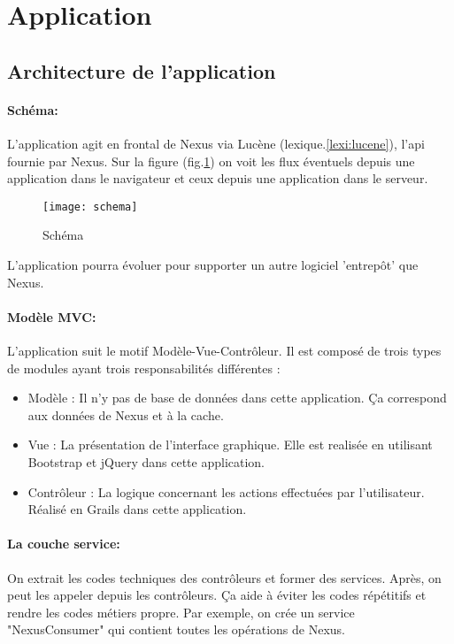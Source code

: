 \section{Application}

\subsection{Architecture de l'application}

\paragraph{Schéma:}
L'application agit en frontal de Nexus via Lucène (lexique.\ref{lexi:lucene}), l'api fournie par Nexus.
Sur la figure (fig.\ref{fig:schema}) on voit les flux éventuels depuis une application dans le navigateur et ceux depuis une application dans le serveur.

\begin{figure}[ht]
 \centering
 \texttt{[image: schema]}
 \caption{Schéma}
 \label{fig:schema}
\end{figure}

L'application pourra évoluer pour supporter un autre logiciel 'entrepôt' que Nexus.

\paragraph{Modèle MVC:}
L'application suit le motif Modèle-Vue-Contrôleur.
Il est composé de trois types de modules ayant trois responsabilités différentes :
\begin{itemize}
 \item Modèle : Il n'y pas de base de données dans cette application. Ça correspond
       aux données de Nexus et à la cache.
 \item Vue : La présentation de l'interface graphique.
       Elle est realisée en utilisant Bootstrap et jQuery dans cette application.
 \item Contrôleur : La logique concernant les actions effectuées par l'utilisateur.
       Réalisé en Grails dans cette application.
\end{itemize}

\paragraph{La couche service:}
On extrait les codes techniques des contrôleurs et former des services. Après, on peut les appeler depuis les contrôleurs.
Ça aide à éviter les codes répétitifs et rendre les codes métiers propre.
Par exemple, on crée un service "NexusConsumer" qui contient toutes les opérations de Nexus.

